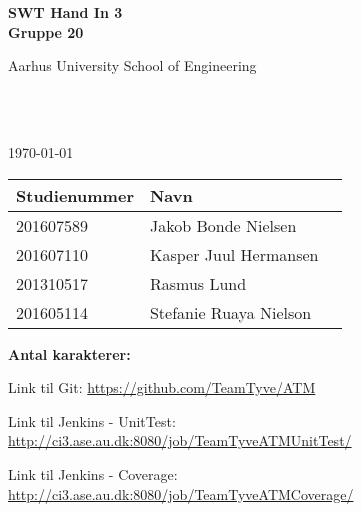 \begin{center}
	{\fontsize{36pt}{0}\selectfont
		\textbf{
		SWT Hand In 3\\
		Gruppe 20\\
		}
	}
	\vspace{20pt}

	{\fontsize{14pt}{0}\selectfont
		Aarhus University School of Engineering\\
	}
	\vspace{20pt}

	{\fontsize{24pt}{0}\selectfont
		\thetitle\\
	}
	\vspace{20pt}

	{\fontsize{18pt}{0}\selectfont
		\ifdefined\frontpageDate
			\frontpageDate\\
		\else
			\today\\
		\fi
	}
	\vspace{20pt}

	\vspace{5pt}
	\begin{tabular}{|l|l|l|}
		\hline
		\rowcolor{gray!50}
		\textbf{Studienummer} & \textbf{Navn}\\ [5px]
		\hline
		201607589 & Jakob Bonde Nielsen\\
		\hline
		201607110 & Kasper Juul Hermansen\\
		\hline
		201310517 & Rasmus Lund\\
		\hline
		201605114 & Stefanie Ruaya Nielson\\
		\hline
	\end{tabular}


	\ifdefined\frontpageCharacters
		\vspace{10pt}
		\textbf{Antal karakterer: } \frontpageCharacters\\
	\fi
	\vspace{30pt}

\end{center}

Link til Git: \url{https://github.com/TeamTyve/ATM} \newline

Link til Jenkins - UnitTest: \url{http://ci3.ase.au.dk:8080/job/TeamTyveATMUnitTest/} \newline

Link til Jenkins - Coverage: \url{http://ci3.ase.au.dk:8080/job/TeamTyveATMCoverage/}